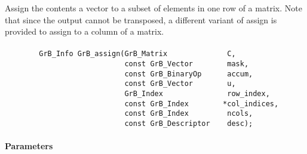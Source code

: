 Assign the contents a vector to a subset of elements in one row of a matrix. 
Note that since the output cannot be transposed, a different variant of
{\sf assign} is provided to assign to a column of a matrix.


\paragraph{\syntax}

\begin{verbatim}
        GrB_Info GrB_assign(GrB_Matrix              C,
                            const GrB_Vector        mask,
                            const GrB_BinaryOp      accum,
                            const GrB_Vector        u,
                            GrB_Index               row_index,
                            const GrB_Index        *col_indices,
                            const GrB_Index         ncols,
                            const GrB_Descriptor    desc); 
\end{verbatim}

\paragraph{Parameters}

